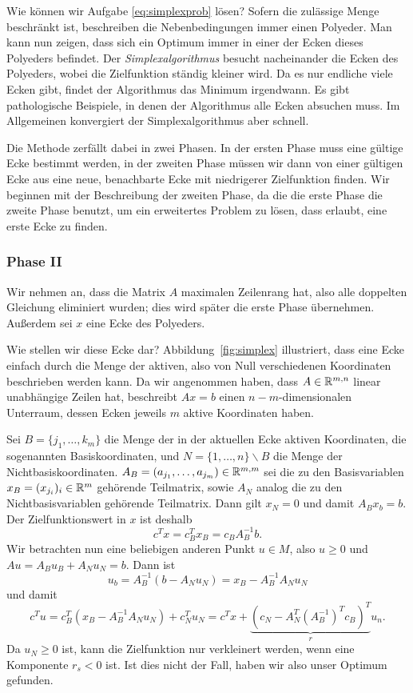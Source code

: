 Wie können wir Aufgabe \eqref{eq:simplexprob} lösen? Sofern die
zulässige Menge beschränkt ist, beschreiben die Nebenbedingungen immer
einen Polyeder. Man kann nun zeigen, dass sich ein Optimum immer in
einer der Ecken dieses Polyeders befindet. Der
\emph{Simplexalgorithmus} besucht nacheinander die Ecken des
Polyeders, wobei die Zielfunktion ständig kleiner wird. Da es nur
endliche viele Ecken gibt, findet der Algorithmus das Minimum
irgendwann. Es gibt pathologische Beispiele, in denen der Algorithmus
alle Ecken absuchen muss. Im Allgemeinen konvergiert der
Simplexalgorithmus aber schnell.

Die Methode zerfällt dabei in zwei Phasen. In der ersten Phase muss
eine gültige Ecke bestimmt werden, in der zweiten Phase müssen wir
dann von einer gültigen Ecke aus eine neue, benachbarte Ecke mit
niedrigerer Zielfunktion finden. Wir beginnen mit der Beschreibung der
zweiten Phase, da die die erste Phase die zweite Phase benutzt, um ein
erweitertes Problem zu lösen, dass erlaubt, eine erste Ecke zu finden.

\subsubsection*{Phase II}

Wir nehmen an, dass die Matrix $A$ maximalen Zeilenrang hat, also alle
doppelten Gleichung eliminiert wurden; dies wird später die erste
Phase übernehmen.  Außerdem sei $x$ eine Ecke des Polyeders.

Wie stellen wir diese Ecke dar? Abbildung~\ref{fig:simplex}
illustriert, dass eine Ecke einfach durch die Menge der aktiven, also
von Null verschiedenen Koordinaten beschrieben werden kann. Da wir
angenommen haben, dass $A\in\mathbb{R}^{m,n}$ linear unabhängige Zeilen hat,
beschreibt $Ax=b$ einen $n-m$-dimensionalen Unterraum, dessen Ecken
jeweils $m$ aktive Koordinaten haben.

Sei $B=\{j_1,\ldots,k_m\}$ die Menge der in der aktuellen Ecke aktiven
Koordinaten, die sogenannten Basiskoordinaten, und
$N=\{1,\ldots,n\}\backslash B$ die Menge der
Nichtbasiskoordinaten. $A_B = (a_{j_1},\ldots,a_{j_m})\in\mathbb{R}^{m,m}$
sei die zu den Basisvariablen $x_B = (x_{j_i})_i\in\mathbb{R}^m$ gehörende
Teilmatrix, sowie $A_N$ analog die zu den Nichtbasisvariablen
gehörende Teilmatrix. Dann gilt $x_N=0$ und damit $A_Bx_b = b$.
Der Zielfunktionswert in $x$ ist deshalb
\begin{equation}
  c^Tx = c_B^Tx_B = c_BA_B^{-1}b.
\end{equation}
Wir betrachten nun eine beliebigen anderen Punkt $u\in M$, also $u\ge
0$ und $Au=A_Bu_B + A_Nu_N = b$. Dann ist
\begin{equation}
  \label{eq:simplexub}
  u_b = A_B^{-1}(b - A_Nu_N) = x_B - A_B^{-1}A_Nu_N
\end{equation}
und damit
\begin{equation}
  c^Tu = c_B^T(x_B - A_B^{-1}A_Nu_N) + c_N^Tu_N = c^Tx +
  \underbrace{\left(c_N - A_N^T\left(A_B^{-1}\right)^Tc_B\right)^T}_{r}u_n.
\end{equation}
Da $u_N\ge 0$ ist, kann die Zielfunktion nur verkleinert werden, wenn
eine Komponente $r_s < 0$ ist. Ist dies nicht der Fall, haben wir also
unser Optimum gefunden.

